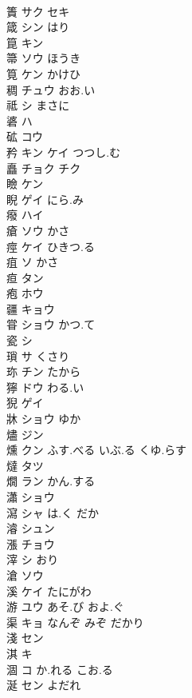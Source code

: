 \documentclass[8pt]{extreport}
\begin{document}
\begin{CJK}{UTF8}{min}
\\	簀	サク セキ			
\\	箴	シン はり			
\\	箟	キン					
\\	箒	ソウ ほうき			
\\	筧	ケン かけひ			
\\	稠	チュウ おお.い			
\\	祗	シ まさに			
\\	碆	ハ			
\\	砿	コウ			
\\	矜	キン ケイ つつし.む			
\\	矗	チョク チク			
\\	瞼	ケン			
\\	睨	ゲイ にら.み			
\\	癈	ハイ			
\\	瘡	ソウ かさ			
\\	痙	ケイ ひきつ.る			
\\	疽	ソ かさ			
\\	疸	タン			
\\	疱	ホウ			
\\	疆	キョウ			
\\	甞	ショウ かつ.て			
\\	瓷	シ			
\\	瑣	サ くさり			
\\	珎	チン たから					
\\	獰	ドウ わる.い			
\\	猊	ゲイ			
\\	牀	ショウ ゆか					
\\	燼	ジン			
\\	燻	クン ふす.べる いぶ.る くゆ.らす			
\\	燵	タツ			
\\	燗	ラン かん.する			
\\	瀟	ショウ			
\\	瀉	シャ は.く だか			
\\	濬	シュン			
\\	漲	チョウ			
\\	滓	シ おり			
\\	滄	ソウ			
\\	溪	ケイ たにがわ			
\\	游	ユウ あそ.び およ.ぐ			
\\	渠	キョ なんぞ みぞ だかり			
\\	淺	セン					
\\	淇	キ			
\\	涸	コ か.れる こお.る			
\\	涎	セン よだれ			

\end{CJK}
\end{document}
